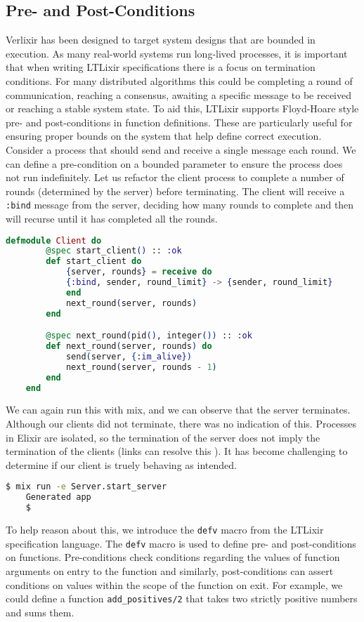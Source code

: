 \subsection{Pre- and Post-Conditions}
Verlixir has been designed to target system designs that are bounded in execution. As many real-world systems run long-lived processes, it is important that when writing LTLixir specifications there is a focus on termination conditions. For many distributed algorithms this could be completing a round of communication, reaching a consensus, awaiting a specific message to be received or reaching a stable system state. To aid this, LTLixir supports Floyd-Hoare style pre- and post-conditions in function definitions. These are particularly useful for ensuring proper bounds on the system that help define correct execution. Consider a process that should send and receive a single message each round. We can define a pre-condition on a bounded parameter to ensure the process does not run indefinitely. Let us refactor the client process to complete a number of rounds (determined by the server) before terminating. The client will receive a \texttt{:bind} message from the server, deciding how many rounds to complete and then will recurse until it has completed all the rounds.
\begin{lstlisting}[language=Elixir, xleftmargin=.3\linewidth]
    defmodule Client do
        @spec start_client() :: :ok
        def start_client do
            {server, rounds} = receive do
            {:bind, sender, round_limit} -> {sender, round_limit}
            end
            next_round(server, rounds)
        end

        @spec next_round(pid(), integer()) :: :ok
        def next_round(server, rounds) do
            send(server, {:im_alive})
            next_round(server, rounds - 1)
        end
    end
\end{lstlisting}
We can again run this with mix, and we can observe that the server terminates. Although our clients did not terminate, there was no indication of this. Processes in Elixir are isolated, so the termination of the server does not imply the termination of the clients (links can resolve this \cite{elixir_links}). It has become challenging to determine if our client is truely behaving as intended.
\begin{lstlisting}[language=bash, xleftmargin=.3\linewidth]
    $ mix run -e Server.start_server
    Generated app
    $
\end{lstlisting}
To help reason about this, we introduce the \texttt{defv} macro from the LTLixir specification language. The \texttt{defv} macro is used to define pre- and post-conditions on functions. Pre-conditions check conditions regarding the values of function arguments on entry to the function and similarly, post-conditions can assert conditions on values within the scope of the function on exit. For example, we could define a function \texttt{add\_positives/2} that takes two strictly positive numbers and sums them.
